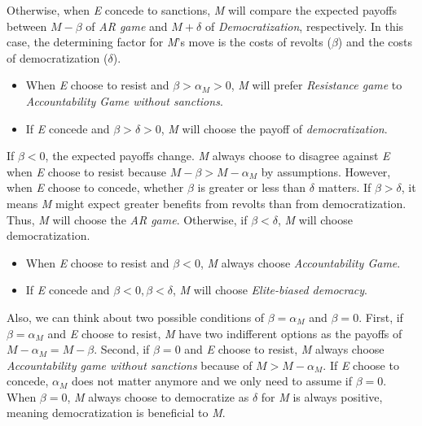 \documentclass[11pt]{article}
\begin{document}
Otherwise, when \textit{E} concede to sanctions, \textit{M} will compare the expected payoffs between $M-\beta$ of \textit{AR game} and $M + \delta$ of \textit{Democratization}, respectively. In this case, the determining factor for \textit{M}'s move is the costs of revolts ($\beta$) and the costs of democratization ($\delta$).

\begin{itemize}
	\item When \textit{E} choose to resist and $\beta > \alpha_{M} > 0$, \textit{M} will prefer \textit{Resistance game} to \textit{Accountability Game without sanctions}.
	\item If \textit{E} concede and $\beta > \delta > 0$, \textit{M} will choose the payoff of \textit{democratization}.
\end{itemize}

If $\beta < 0$, the expected payoffs change. \textit{M} always choose to disagree against \textit{E} when \textit{E} choose to resist because $M-\beta > M-\alpha_{M}$ by assumptions. However, when \textit{E} choose to concede, whether $\beta$ is greater or less than $\delta$ matters. If $\beta > \delta$, it means \textit{M} might expect greater benefits from revolts than from democratization. Thus, \textit{M} will choose the \textit{AR game}. Otherwise, if $\beta < \delta$, \textit{M} will choose democratization.

\begin{itemize}
	\item When \textit{E} choose to resist and $\beta < 0$, \textit{M} always choose \textit{Accountability Game}.
	\item If \textit{E} concede and $\beta < 0, \beta < \delta$, \textit{M} will choose \textit{Elite-biased democracy}.
\end{itemize}

Also, we can think about two possible conditions of $\beta = \alpha_{M}$ and $\beta = 0$. First, if $\beta = \alpha_{M}$ and \textit{E} choose to resist, \textit{M} have two indifferent options as the payoffs of $M-\alpha_{M} = M-\beta$. Second, if $\beta = 0$ and \textit{E} choose to resist, \textit{M} always choose \textit{Accountability game without sanctions} because of $M > M-\alpha_{M}$. If \textit{E} choose to concede, $\alpha_{M}$ does not matter anymore and we only need to assume if $\beta = 0$. When $\beta = 0$, \textit{M} always choose to democratize as $\delta$ for \textit{M} is always positive, meaning democratization is beneficial to \textit{M}.
\end{document}
